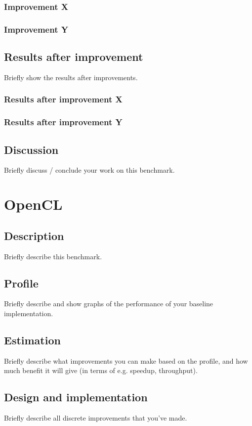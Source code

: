 \documentclass[twocolumn]{article}
\begin{document}
\subsubsection{Improvement X}
\subsubsection{Improvement Y}
\subsection{Results after improvement}
Briefly show the results after improvements.
\subsubsection{Results after improvement X}


\subsubsection{Results after improvement Y}
\subsection{Discussion}
Briefly discuss / conclude your work on this benchmark.

\section{OpenCL}
\subsection{Description}
Briefly describe this benchmark.
\subsection{Profile}
Briefly describe and show graphs of the performance of your baseline implementation.
\subsection{Estimation}
Briefly describe what improvements you can make based on the profile, and how much benefit it will give (in terms of e.g. speedup, throughput).
\subsection{Design and implementation}
Briefly describe all discrete improvements that you've made.
\end{document}
